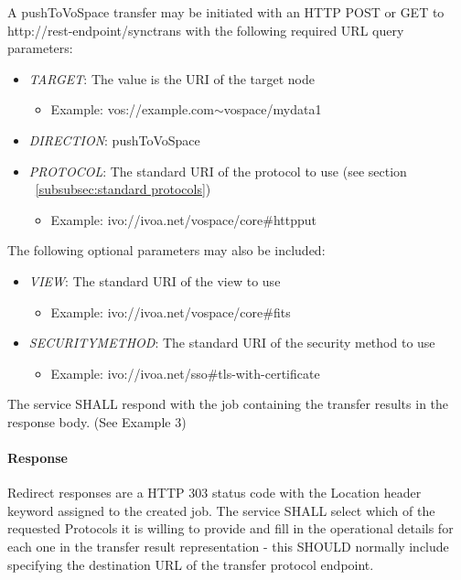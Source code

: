\documentclass[11pt,a4paper]{ivoa}
\begin{document}
A pushToVoSpace transfer may be initiated with an HTTP POST or GET to http://rest-endpoint/synctrans with the following required URL query parameters:
\begin{itemize}
    \item \emph{TARGET}: The value is the URI of the target node
        \begin{itemize}
           \item Example:  vos://example.com$\mathtt{\sim}$vospace/mydata1
        \end{itemize}
    \item \emph{DIRECTION}: pushToVoSpace
    \item \emph{PROTOCOL}: The standard URI of the protocol to use (see section ~\ref{subsubsec:standard protocols})
        \begin{itemize}
           \item Example: ivo://ivoa.net/vospace/core\#httpput
        \end{itemize}
\end{itemize}

The following optional parameters may also be included:
\begin{itemize}
    \item \emph{VIEW}: The standard URI of the view to use
        \begin{itemize}
           \item Example:  ivo://ivoa.net/vospace/core\#fits
        \end{itemize}
    \item \emph{SECURITYMETHOD}: The standard URI of the security method to use
        \begin{itemize}
           \item Example:  ivo://ivoa.net/sso\#tls-with-certificate
        \end{itemize}
\end{itemize}

The service SHALL respond with the job containing the transfer results in the response body.  (See Example 3)

\paragraph{Response}
Redirect responses are a HTTP 303 status code with the Location header keyword assigned to the created job.
The service SHALL select which of the requested Protocols it is willing to provide and fill in the operational details for each one in the transfer result representation - this SHOULD normally include specifying the destination URL of the transfer protocol endpoint.
\end{document}
